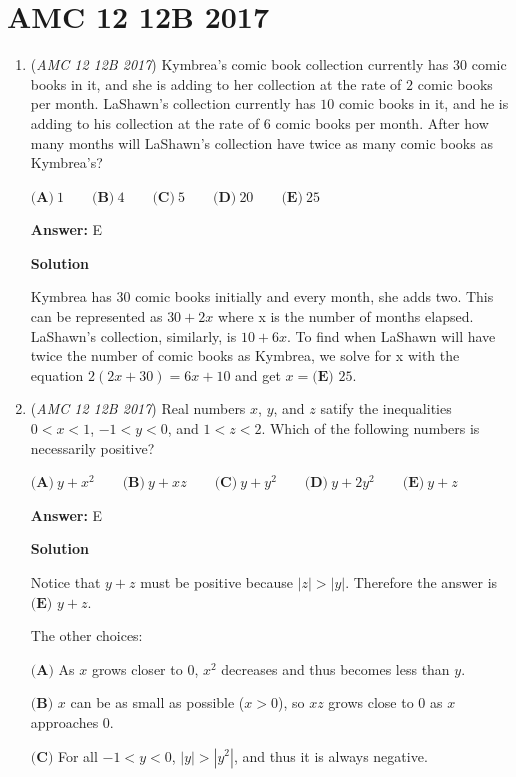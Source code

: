 \section{AMC 12 12B 2017}
        \begin{enumerate}
        	\item (\textit{AMC 12 12B 2017}) Kymbrea's comic book collection currently has $30$ comic books in it, and she is adding to her collection at the rate of $2$ comic books per month. LaShawn's collection currently has $10$ comic books in it, and he is adding to his collection at the rate of $6$ comic books per month. After how many months will LaShawn's collection have twice as many comic books as Kymbrea's?


 $\textbf{(A)}\ 1\qquad\textbf{(B)}\ 4\qquad\textbf{(C)}\ 5\qquad\textbf{(D)}\ 20\qquad\textbf{(E)}\ 25$

 \textbf{Answer: }E



\textbf{Solution}

Kymbrea has $30$ comic books initially and every month, she adds two. This can be represented as $30 + 2x$ where x is the number of months elapsed. LaShawn's collection, similarly, is $10 + 6x$. To find when LaShawn will have twice the number of comic books as Kymbrea, we solve for x with the equation $2(2x + 30) = 6x + 10$ and get $x = \boxed{\textbf{(E) } 25}$.

 


	\item (\textit{AMC 12 12B 2017}) Real numbers $x$, $y$, and $z$ satify the inequalities
$0<x<1$, $-1<y<0$, and $1<z<2$.
Which of the following numbers is necessarily positive?


 $\textbf{(A)}\ y+x^2\qquad\textbf{(B)}\ y+xz\qquad\textbf{(C)}\ y+y^2\qquad\textbf{(D)}\ y+2y^2\qquad\textbf{(E)}\ y+z$

 \textbf{Answer: }E



\textbf{Solution}

Notice that $y+z$ must be positive because $|z|>|y|$. Therefore the answer is $\boxed{\textbf{(E) } y+z}$.

 The other choices:

 $\textbf{(A)}$ As $x$ grows closer to $0$, $x^2$ decreases and thus becomes less than $y$.

 $\textbf{(B)}$ $x$ can be as small as possible ($x>0$), so $xz$ grows close to $0$ as $x$ approaches $0$.

 $\textbf{(C)}$ For all $-1<y<0$, $|y|>|y^2|$, and thus it is always negative.


\end{enumerate}
